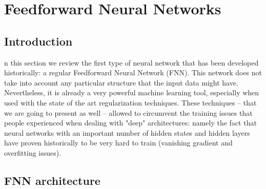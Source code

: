  \chapter{Feedforward Neural Networks} \label{sec:chapterFNN}

\minitoc

\section{Introduction}

n this section we review the first type of neural network that has been developed historically: a regular Feedforward Neural Network (FNN). This network does not take into account any particular structure that the input data might have. Nevertheless, it is already a very powerful machine learning tool, especially when used with the state of the art regularization techniques. These techniques -- that we are going to present as well -- allowed to circumvent the training issues that people experienced when dealing with "deep" architectures: namely the fact that neural networks with an important number of hidden states and hidden layers have proven historically to be very hard to train (vanishing gradient and overfitting issues).

\section{FNN architecture}

